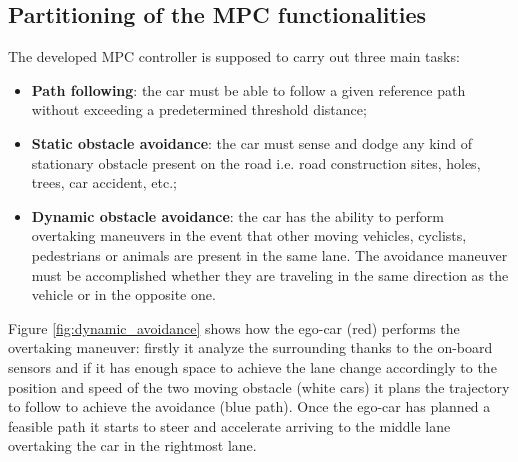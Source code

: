 \subsection{Partitioning of the MPC functionalities}
The developed MPC controller is supposed to carry out three main tasks: 
\begin{itemize}
    \item \textbf{Path following}: the car must be able to follow a given reference path without exceeding a predetermined threshold distance;
    \item \textbf{Static obstacle avoidance}: the car must sense and dodge any kind of stationary obstacle present on the road i.e. road construction sites, holes, trees,  car accident, etc.;
    \item \textbf{Dynamic obstacle avoidance}: the car has the ability to perform overtaking maneuvers in the event that other moving vehicles, cyclists, pedestrians or animals are present in the same lane. The avoidance maneuver must be accomplished whether they are traveling in the same direction as the vehicle or in the opposite one.
\end{itemize}
Figure \ref{fig:dynamic_avoidance} shows how the ego-car (red) performs the overtaking maneuver: firstly it analyze the surrounding thanks to the on-board sensors and if it has enough space to achieve the lane change accordingly to the position and speed of the two moving obstacle (white cars) it plans the trajectory to follow to achieve the avoidance (blue path). Once the ego-car has planned a feasible path it starts to steer and accelerate arriving to the middle lane overtaking the car in the rightmost lane.


